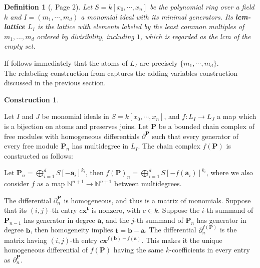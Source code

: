 \documentclass[dvipsnames,10pt]{article}
\newtheorem{defi}[theorem]{Definition}
\newtheorem{construction}[theorem]{Construction}
\begin{document}
\begin{defi}[\cite{welker1999lcm}, Page 2]
    Let $S=k[x_0,\cdots,x_n]$ be the polynomial ring over a field $k$ and $I=(m_1,\cdots, m_d)$ a monomial ideal with its minimal generators. Its \textbf{lcm-lattice} $L_I$ is the lattice with elements labeled by the least common multiples of $m_1,... ,m_d$ ordered by divisibility, including $1$, which is regarded as the lcm of the empty set.
\end{defi}

If follows immediately that the atoms of $L_I$ are precisely $\{m_1,\cdots,m_d\}$.\\

The relabeling construction from \cite{welker1999lcm} captures the adding variables construction discussed in the previous section.

\begin{construction}
    
\end{construction}
\vspace{-4pt}

Let $I$ and $J$ be monomial ideals in $S=k[x_0,\cdots,x_n]$, and $f:L_I\to L_J$ a map which is a bijection on atoms and preserves joins. Let $\mathbf{P}$ be a bounded chain complex of free modules with homogeneous differentials $\partial^\mathbf{P}$ such that every generator of every free module $\mathbf{P}_n$ has multidegree in $L_I$. The chain complex $f(\mathbf{P})$ is constructed as follows:

Let $\mathbf{P}_n=\bigoplus_{i=1}^{d} S[-\mathbf{a}_i]^{k_i}$, then $f(\mathbf{P})_n=\bigoplus_{i=1}^{d} S[-f(\mathbf{a}_i)]^{k_i}$, where we also consider $f$ as a map $\mathbb{N}^{n+1}\to \mathbb{N}^{n+1}$ between multidegrees.

The differential $\partial^\mathbf{P}_n$ is homogeneous, and thus is a matrix of monomials. Suppose that its $(i,j)$-th entry $c \mathbf{x}^\mathbf{t}$ is nonzero, with $c\in k$. Suppose the $i$-th summand of $\mathbf{P}_{n-1}$ has generator in degree $\mathbf{a}$, and the $j$-th summand of $\mathbf{P}_n$ has generator in degree $\mathbf{b}$, then homogeneity implies $\mathbf{t} = \mathbf{b} - \mathbf{a}$. The differential $\partial^{f(\mathbf{P})}_n$ is the matrix having $(i,j)$-th entry $c \mathbf{x}^{f(\mathbf{b}) - f(\mathbf{a})}$. This makes it the unique homogeneous differential of $f(\mathbf{P})$ having the same $k$-coefficients in every entry as $\partial^\mathbf{P}_n$.\\
\end{document}
